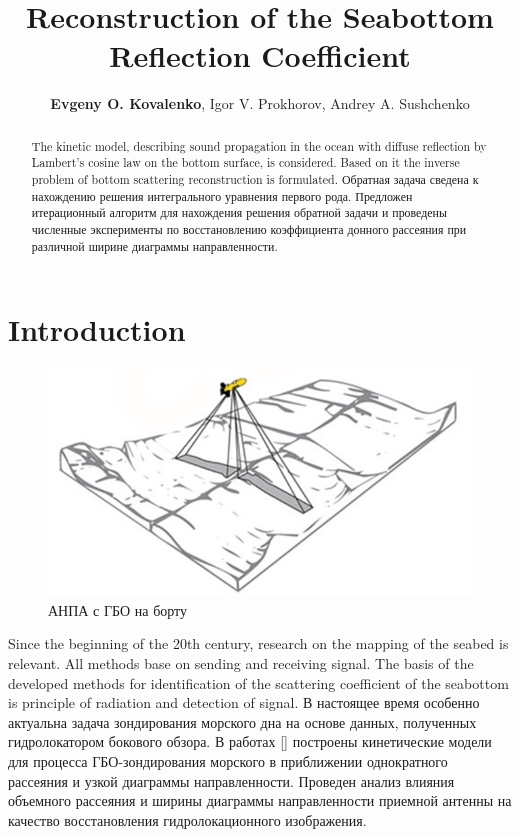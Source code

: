 \documentclass{procDDs}
\title{Reconstruction of the Seabottom Reflection Coefficient}
\author{\textbf{Evgeny O. Kovalenko}, Igor V. Prokhorov, Andrey A. Sushchenko}%
{Institute for Applied Mathematics, FEB RAS, Vladivostok, Russia, \\ 
Far Eastern Federal University, Vladivostok, Russia}                 %
{kovalenko.eo@dvfu.ru, sushchenko.aa@dvfu.ru}                                   %
\begin{document}
\maketitle

\def\k{\mathbf{k}}
\def\n{\mathbf{n}}
\def\x{\mathbf{x}}
\def\y{\mathbf{y}}
\def\r{\mathbf{r}}
\def\p{\mathbf{|}}
\def\z{\mathbf{z}}
\def\V{\mathbf{V}}
\def\Vt{\mathbf{V}t}
\def\exp{\text{exp}}

\begin{abstract}
   The kinetic model, describing sound propagation in the ocean with diffuse reflection by Lambert's cosine law on the bottom surface, is considered. Based on it the inverse problem of bottom scattering reconstruction is formulated. Обратная задача сведена к нахождению решения интегрального уравнения первого рода.
   Предложен итерационный алгоритм для нахождения решения обратной задачи и проведены численные эксперименты по восстановлению коэффициента донного рассеяния при различной ширине диаграммы направленности. 
\end{abstract}

\section{Introduction}

\begin{figure}[h!]\center
	
	\includegraphics[width=1\linewidth]{img/gbo.jpg}
	\caption{АНПА с ГБО на борту}
	\label{ris:dno}
\end{figure}

Since the beginning of the 20th century, research on the mapping of the seabed is relevant. All methods base on sending and receiving signal. The basis of the developed methods for identification of the scattering coefficient of the seabottom is principle of radiation and detection of signal. 
В настоящее время особенно актуальна задача зондирования морского дна на основе данных, полученных  гидролокатором бокового обзора. В работах []  построены кинетические модели для процесса ГБО-зондирования морского в приближении однократного рассеяния и узкой диаграммы направленности.   Проведен  анализ влияния объемного рассеяния и ширины диаграммы направленности приемной антенны на качество восстановления гидролокационного изображения.   
\end{document}

